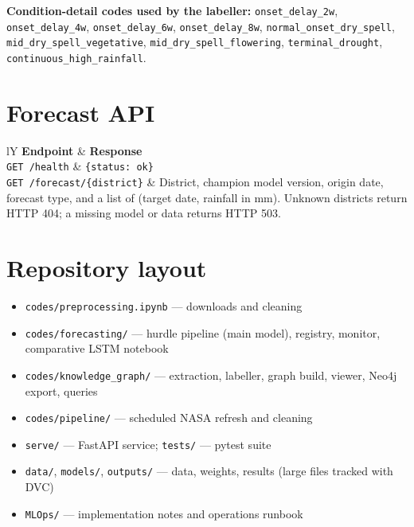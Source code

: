 \textbf{Condition-detail codes used by the labeller:} \texttt{onset\_delay\_2w}, \texttt{onset\_delay\_4w}, \texttt{onset\_delay\_6w}, \texttt{onset\_delay\_8w}, \texttt{normal\_onset\_dry\_spell}, \texttt{mid\_dry\_spell\_vegetative}, \texttt{mid\_dry\_spell\_flowering}, \texttt{terminal\_drought}, \texttt{continuous\_high\_rainfall}.

\section{Forecast API}
\begin{table}[H]
	\centering
	\caption{FastAPI endpoints}
	\small
	\begin{tabularx}{\textwidth}{lY}
		\toprule
		\textbf{Endpoint} & \textbf{Response} \\
		\midrule
		\texttt{GET /health} & \texttt{\{status: ok\}} \\
		\texttt{GET /forecast/\{district\}} & District, champion model version, origin date, forecast type, and a list of (target date, rainfall in mm). Unknown districts return HTTP 404; a missing model or data returns HTTP 503. \\
		\bottomrule
	\end{tabularx}
\end{table}

\section{Repository layout}
\begin{itemize}
	\item \texttt{codes/preprocessing.ipynb} --- downloads and cleaning
	\item \texttt{codes/forecasting/} --- hurdle pipeline (main model), registry, monitor, comparative LSTM notebook
	\item \texttt{codes/knowledge\_graph/} --- extraction, labeller, graph build, viewer, Neo4j export, queries
	\item \texttt{codes/pipeline/} --- scheduled NASA refresh and cleaning
	\item \texttt{serve/} --- FastAPI service; \texttt{tests/} --- pytest suite
	\item \texttt{data/}, \texttt{models/}, \texttt{outputs/} --- data, weights, results (large files tracked with DVC)
	\item \texttt{MLOps/} --- implementation notes and operations runbook
\end{itemize}
